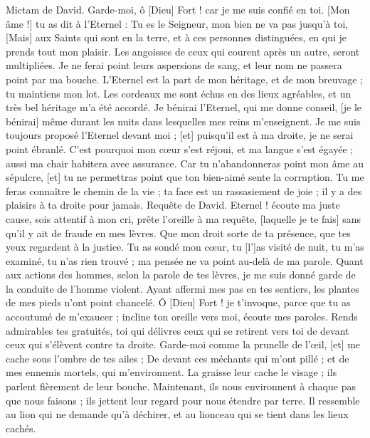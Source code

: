 \begin{multicols}{2}
\VerseOne{}Mictam de David. Garde-moi, ô [Dieu] Fort ! car je me suis confié en toi.
[Mon âme !] tu as dit à l'Eternel : Tu es le Seigneur, mon bien ne va pas jusqu'à toi,
[Mais] aux Saints qui sont en la terre, et à ces personnes distinguées, en qui je prends tout mon plaisir.
Les angoisses de ceux qui courent après un autre, seront multipliées. Je ne ferai point leurs aspersions de sang, et leur nom ne passera point par ma bouche.
L'Eternel est la part de mon héritage, et de mon breuvage ; tu maintiens mon lot.
Les cordeaux me sont échus en des lieux agréables, et un très bel héritage m'a été accordé.
Je bénirai l'Eternel, qui me donne conseil, [je le bénirai] même durant les nuits dans lesquelles mes reins m'enseignent.
Je me suis toujours proposé l'Eternel devant moi ; [et] puisqu'il est à ma droite, je ne serai point ébranlé.
C'est pourquoi mon cœur s'est réjoui, et ma langue s'est égayée ; aussi ma chair habitera avec assurance.
Car tu n'abandonneras point mon âme au sépulcre, [et] tu ne permettras point que ton bien-aimé sente la corruption.
Tu me feras connaître le chemin de la vie ; ta face est un rassasiement de joie ; il y a des plaisirs à ta droite pour jamais.
\VerseOne{}Requête de David. Eternel ! écoute ma juste cause, sois attentif à mon cri, prête l'oreille à ma requête, [laquelle je te fais] sans qu'il y ait de fraude en mes lèvres.
Que mon droit sorte de ta présence, que tes yeux regardent à la justice.
Tu as sondé mon cœur, tu [l']as visité de nuit, tu m'as examiné, tu n'as rien trouvé ; ma pensée ne va point au-delà de ma parole.
Quant aux actions des hommes, selon la parole de tes lèvres, je me suis donné garde de la conduite de l'homme violent.
Ayant affermi mes pas en tes sentiers, les plantes de mes pieds n'ont point chancelé.
Ô [Dieu] Fort ! je t'invoque, parce que tu as accoutumé de m'exaucer ; incline ton oreille vers moi, écoute mes paroles.
Rends admirables tes gratuités, toi qui délivres ceux qui se retirent vers toi de devant ceux qui s'élèvent contre ta droite.
Garde-moi comme la prunelle de l'œil, [et] me cache sous l'ombre de tes ailes ;
De devant ces méchants qui m'ont pillé ; et de mes ennemis mortels, qui m'environnent.
La graisse leur cache le visage ; ils parlent fièrement de leur bouche.
Maintenant, ils nous environnent à chaque pas que nous faisons ; ils jettent leur regard pour nous étendre par terre.
Il ressemble au lion qui ne demande qu'à déchirer, et au lionceau qui se tient dans les lieux cachés.

\end{multicols}
